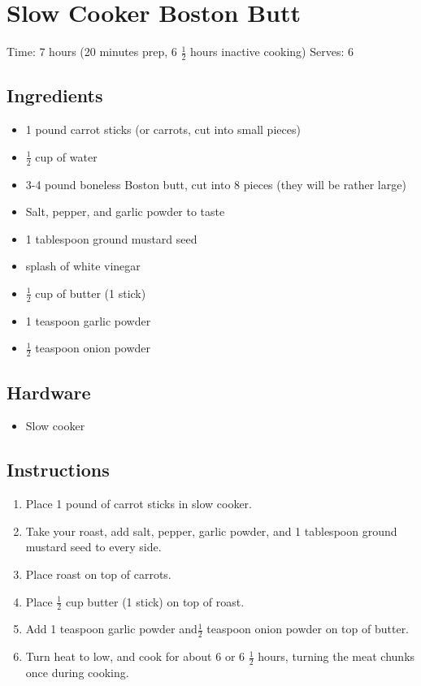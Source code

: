 \section{Slow Cooker Boston Butt}
\label{slowCookerBostonButt}
\setcounter{secnumdepth}{0}
Time: 7 hours (20 minutes prep, 6 \( \frac{1}{2} \) hours inactive cooking)
Serves: 6

\begin{multicols}{2}
\subsection*{Ingredients}
\begin{itemize}
    \item 1 pound carrot sticks (or carrots, cut into small pieces)
    \item \( \frac{1}{2} \) cup of water
    \item 3-4 pound boneless Boston butt, cut into 8 pieces (they will be rather large)
    \item Salt, pepper, and garlic powder to taste
    \item 1 tablespoon ground mustard seed
    \item splash of white vinegar
    \item \( \frac{1}{2} \) cup of butter (1 stick)
    \item 1 teaspoon garlic powder
    \item \( \frac{1}{2} \) teaspoon onion powder
\end{itemize}

\subsection*{Hardware}
\begin{itemize}
    \item Slow cooker
\end{itemize}
\clearpage

\subsection*{Instructions}
\begin{enumerate}
    \item Place 1 pound of carrot sticks in slow cooker.
    \item Take your roast, add salt, pepper, garlic powder, and 1 tablespoon ground mustard seed to every side.
    \item Place roast on top of carrots.
    \item Place \( \frac{1}{2} \) cup butter (1 stick) on top of roast.
    \item Add 1 teaspoon garlic powder and\( \frac{1}{2} \) teaspoon onion powder on top of butter.
    \item Turn heat to low, and cook for about 6 or 6 \( \frac{1}{2} \) hours, turning the meat chunks once during cooking.
\end{enumerate}


\end{multicols}
